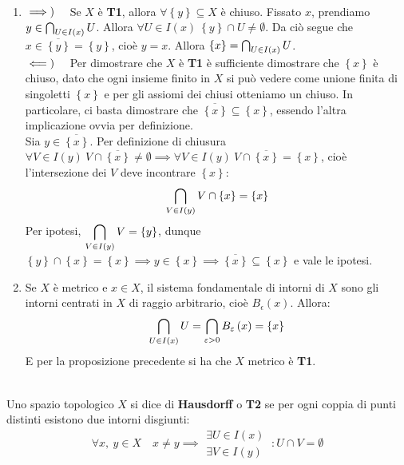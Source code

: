 \begin{demonstration}~{}
\begin{enumerate}[label=\Roman*]
\item $\implies)\quad$ Se $X$ è \textbf{T1}, allora $\forall \left\{y\right\}\subseteq X$ è chiuso. Fissato $x$, prendiamo $y \in \mathop{{\bigcap}}\displaylimits_{U\in I\left(x\right)}U$. Allora $\forall U\in I\left(x\right)\ \left\{y\right\}\cap U\neq \emptyset$. Da ciò segue che $x\in\overline{\left\{y\right\}}=\left\{y\right\}$, cioè $y=x$. Allora $\left\{x\right\}=\mathop{{\bigcap}}\displaylimits_{U\in I\left(x\right)}U$.\\
$\impliedby)\quad$ Per dimostrare che $X$ è \textbf{T1} è sufficiente dimostrare che $\left\{x\right\}$ è chiuso, dato che ogni insieme finito in $X$ si può vedere come unione finita di singoletti $\left\{x\right\}$ e per gli assiomi dei chiusi otteniamo un chiuso. In particolare, ci basta dimostrare che $\overline{\left\{x\right\}}\subseteq \left\{x\right\}$, essendo l'altra implicazione ovvia per definizione.\\
Sia $y\in\overline{\left\{x\right\}}$. Per definizione di chiusura $\forall V\in I\left(y\right)\ V\cap\overline{\left\{x\right\}}\neq\emptyset\implies \forall V\in I\left(y\right)\ V\cap\overline{\left\{x\right\}}=\left\{x\right\}$, cioè l'intersezione dei $V$ deve incontrare $\left\{x\right\}$:
\begin{equation*}
\mathop{{\bigcap}}\displaylimits_{V\in I\left(y\right)}V\cap\left\{x\right\}=\left\{x\right\}
\end{equation*}
Per ipotesi, $\displaystyle \mathop{{\bigcap}}\displaylimits_{V\in I\left(y\right)}V=\left\{y\right\}$, dunque $\left\{y\right\}\cap \left\{x\right\}=\left\{x\right\}\implies y\in\left\{x\right\}\implies\overline{\left\{x\right\}}\subseteq \left\{x\right\}$ e vale le ipotesi.
\item Se $X$ è metrico e $x\in X$, il sistema fondamentale di intorni di $X$ sono gli intorni centrati in $X$ di raggio arbitrario, cioè $B_{\epsilon}\left(x\right)$. Allora:
\begin{equation*}
\mathop{{\bigcap}}\displaylimits_{U\in I\left(x\right)}U=\mathop{{\bigcap}}\displaylimits_{\varepsilon > 0}B_{\varepsilon}\left(x\right)=\left\{x\right\}
\end{equation*}
E per la proposizione precedente si ha che $X$ metrico è \textbf{T1}.
\end{enumerate}
\end{demonstration}
\begin{define}~{}\\
Uno spazio topologico $X$ si dice di \textbf{Hausdorff} o \textbf{T2} se per ogni coppia di punti distinti esistono due intorni disgiunti:
\begin{equation}
	\forall x,\ y\in X\quad x\neq y\implies
	\begin{array}{l}
		\exists U\in I\left(x\right)\\
		\exists V\in I\left(y\right)
	\end{array}
\ \colon U\cap V=\emptyset
\end{equation}
\vspace{-6mm}
\end{define}
